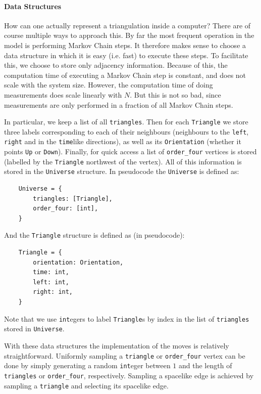 \paragraph{Data Structures}
How can one actually represent a triangulation inside a computer? There are of course multiple ways to approach this. By far the most frequent operation in the model is performing Markov Chain steps. It therefore makes sense to choose a data structure in which it is easy (i.e. fast) to execute these steps. To facilitate this, we choose to store only adjacency information. Because of this, the computation time of executing a Markov Chain step is constant, and does not scale with the system size. However, the computation time of doing measurements does scale linearly with $N$. But this is not so bad, since measurements are only performed in a fraction of all Markov Chain steps.

In particular, we keep a list of all \verb|triangles|. Then for each \verb|Triangle| we store three labels corresponding to each of their neighbours (neighbours to the \verb|left|, \verb|right| and in the \verb|time|like directions), as well as its \verb|Orientation| (whether it points \verb|Up| or \verb|Down|). Finally, for quick access a list of \verb|order_four| vertices is stored (labelled by the \verb|Triangle| northwest of the vertex). All of this information is stored in the \verb|Universe| structure. In pseudocode the \verb|Universe| is defined as:
\begin{verbatim}
    Universe = {
        triangles: [Triangle],
        order_four: [int],
    }
\end{verbatim}
And the \verb|Triangle| structure is defined as (in pseudocode):
\begin{verbatim}
    Triangle = {
        orientation: Orientation,
        time: int,
        left: int,
        right: int,
    }
\end{verbatim}
Note that we use \verb|int|egers to label \verb|Triangle|s by index in the list of \verb|triangles| stored in \verb|Universe|.

With these data structures the implementation of the moves is relatively straightforward. Uniformly sampling a \verb|triangle| or \verb|order_four| vertex can be done by simply generating a random \verb|int|eger between $1$ and the length of \verb|triangles| or \verb|order_four|, respectively. Sampling a spacelike edge is achieved by sampling a \verb|triangle| and selecting its spacelike edge.

